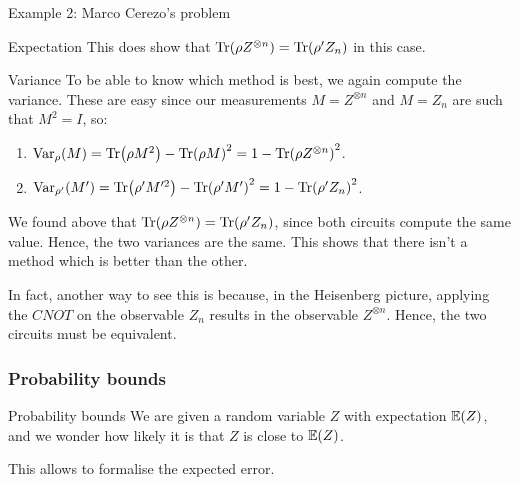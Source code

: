 \documentclass[a4paper]{article}
\begin{document}
\begin{parag}{Example 2: Marco Cerezo's problem}
\begin{subparag}{Expectation}
        This does show that $\Tr\left(\rho Z^{\otimes n}\right) = \Tr\left(\rho' Z_n\right)$ in this case.
    \end{subparag}

    \begin{subparag}{Variance}
        To be able to know which method is best, we again compute the variance. These are easy since our measurements $M = Z^{\otimes n}$ and $M = Z_n$ are such that $M^2 = I$, so:
        \begin{enumerate}[left=0pt]
            \item $\Var_{\rho}\left(M\right) = \Tr\left(\rho M^2\right) - \Tr\left(\rho M\right)^2 = 1 - \Tr\left(\rho Z^{\otimes n}\right)^2$.
            \item $\Var_{\rho'}\left(M'\right) = \Tr\left(\rho' M'^2\right) - \Tr\left(\rho' M'\right)^2 = 1 - \Tr\left(\rho' Z_n\right)^2$. 
        \end{enumerate}

        We found above that $\Tr\left(\rho Z^{\otimes n}\right) = \Tr\left(\rho' Z_n\right)$, since both circuits compute the same value. Hence, the two variances are the same. This shows that there isn't a method which is better than the other.

        In fact, another way to see this is because, in the Heisenberg picture, applying the $CNOT$ on the observable $Z_n$ results in the observable $Z^{\otimes n}$. Hence, the two circuits must be equivalent.
    \end{subparag}
\end{parag}

\subsubsection{Probability bounds}

\begin{parag}{Probability bounds}
    We are given a random variable $Z$ with expectation $\exval\left(Z\right)$, and we wonder how likely it is that $Z$ is close to $\exval\left(Z\right)$.

    This allows to formalise the expected error.
\end{parag}
\end{document}
